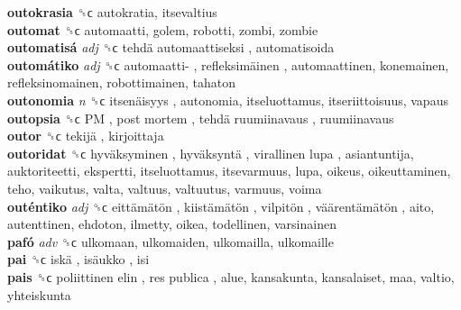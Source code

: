 \textbf{outokrasia} ␝ϲ  autokratia, itsevaltius  \\
\textbf{outomat} ␝ϲ  automaatti, golem, robotti, zombi, zombie  \\
\textbf{outomatisá} \emph{adj}  ␝ϲ   tehdä automaattiseksi , automatisoida  \\
\textbf{outomátiko} \emph{adj}  ␝ϲ   automaatti- ,  refleksimäinen , automaattinen, konemainen, refleksinomainen, robottimainen, tahaton  \\
\textbf{outonomia} \emph{n}  ␝ϲ   itsenäisyys , autonomia, itseluottamus, itseriittoisuus, vapaus  \\
\textbf{outopsia} ␝ϲ   PM ,  post mortem ,  tehdä ruumiinavaus , ruumiinavaus  \\
\textbf{outor} ␝ϲ   tekijä , kirjoittaja  \\
\textbf{outoridat} ␝ϲ   hyväksyminen ,  hyväksyntä ,  virallinen lupa , asiantuntija, auktoriteetti, ekspertti, itseluottamus, itsevarmuus, lupa, oikeus, oikeuttaminen, teho, vaikutus, valta, valtuus, valtuutus, varmuus, voima  \\
\textbf{outéntiko} \emph{adj}  ␝ϲ   eittämätön ,  kiistämätön ,  vilpitön ,  väärentämätön , aito, autenttinen, ehdoton, ilmetty, oikea, todellinen, varsinainen  \\
\textbf{pafó} \emph{adv}  ␝ϲ  ulkomaan, ulkomaiden, ulkomailla, ulkomaille  \\
\textbf{pai} ␝ϲ   iskä ,  isäukko , isi  \\
\textbf{pais} ␝ϲ   poliittinen elin ,  res publica , alue, kansakunta, kansalaiset, maa, valtio, yhteiskunta  \\

